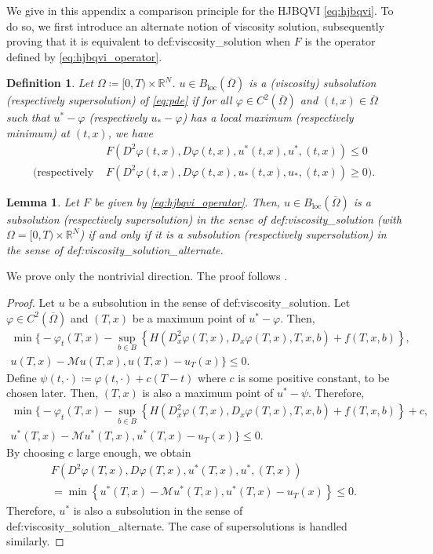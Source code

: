 \documentclass[12pt]{article}
\newcounter{dummy}
\newtheorem{definition}[dummy]{Definition}
\newtheorem{lemma}[dummy]{Lemma}
\begin{document}
We give in this appendix a comparison principle for the HJBQVI \eqref{eq:hjbqvi}.
To do so, we first introduce an alternate notion of viscosity solution,
subsequently proving that it is equivalent to {\prettyref}{def:viscosity_solution}
when $F$ is the operator defined by \eqref{eq:hjbqvi_operator}.
\begin{definition}
\label{def:viscosity_solution_alternate}Let $\Omega\coloneqq[0,T)\times\mathbb{R}^{N}$.
$u\in B_{\operatorname{loc}}(\overline{\Omega})$ is a (viscosity) subsolution (respectively
supersolution) of \eqref{eq:pde} if for all $\varphi\in C^{2}(\overline{\Omega})$
and $(t,x)\in\overline{\Omega}$ such that $u^{*}-\varphi$ (respectively
$u_{*}-\varphi$) has a local maximum (respectively minimum) at $(t,x)$,
we have
\begin{align*}
 & F(D^{2}\varphi(t,x),D\varphi(t,x),u^{*}(t,x),u^{*},(t,x)){\leqslant}0\\
\text{(respectively } & F(D^{2}\varphi(t,x),D\varphi(t,x),u_{*}(t,x),u_{*},(t,x)){\geqslant}0\text{)}.
\end{align*}
\end{definition}
\begin{lemma}
Let $F$ be given by \eqref{eq:hjbqvi_operator}. Then, $u\in B_{\operatorname{loc}}(\overline{\Omega})$
is a subsolution (respectively supersolution) in the sense
of {\prettyref}{def:viscosity_solution} (with $\Omega=[0,T)\times\mathbb{R}^{N}$)
if and only if it is a subsolution (respectively supersolution)
in the sense of {\prettyref}{def:viscosity_solution_alternate}.
\end{lemma}
We prove only the nontrivial direction. The proof follows \cite[Remark 3.2]{MR2857450}.
\begin{proof}
Let $u$ be a subsolution in the sense of {\prettyref}{def:viscosity_solution}.
Let $\varphi\in C^{2}(\overline{\Omega})$ and $(T,x)$ be a maximum
point of $u^{*}-\varphi$. Then,
\begin{multline*}
\min\bigl\{-\varphi_{t}(T,x)-\sup_{b\in B}\left\{ H(D_{x}^{2}\varphi(T,x),D_{x}\varphi(T,x),T,x,b)+f(T,x,b)\right\} ,\\
u(T,x)-\mathcal{M}u(T,x),u(T,x)-u_{T}(x)\bigr\}{\leqslant}0.
\end{multline*}
Define $\psi(t,\cdot)\coloneqq\varphi(t,\cdot)+c(T-t)$ where $c$
is some positive constant, to be chosen later. Then, $(T,x)$ is also
a maximum point of $u^{*}-\psi$. Therefore,
\begin{multline*}
\min\bigl\{-\varphi_{t}(T,x)-\sup_{b\in B}\left\{ H(D_{x}^{2}\varphi(T,x),D_{x}\varphi(T,x),T,x,b)+f(T,x,b)\right\} +c,\\
u^{*}(T,x)-\mathcal{M}u^{*}(T,x),u^{*}(T,x)-u_{T}(x)\bigr\}{\leqslant}0.
\end{multline*}
By choosing $c$ large enough, we obtain
\begin{multline*}
F(D^{2}\varphi(T,x),D\varphi(T,x),u^{*}(T,x),u^{*},(T,x))\\
=\min\left\{ u^{*}(T,x)-\mathcal{M}u^{*}(T,x),u^{*}(T,x)-u_{T}(x)\right\} {\leqslant}0.
\end{multline*}
Therefore, $u^{*}$ is also a subsolution in the sense of {\prettyref}{def:viscosity_solution_alternate}.
The case of supersolutions is handled similarly.
\end{proof}
\end{document}
